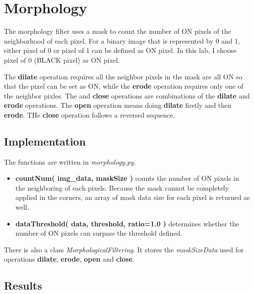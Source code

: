 \documentclass[paper=a4, fontsize=11pt]{scrartcl}
\numberwithin{equation}{section}		%
\numberwithin{figure}{section}			%
\numberwithin{table}{section}				%
\begin{document}
\section{Morphology}

The morphology filter uses a mask to count the number of ON pixels of the neighborhood of each pixel.
For a binary image that is represented by 0 and 1, either pixel of 0 or pixel of 1 can be defined as ON pixel. 
In this lab, I choose pixel of 0 (BLACK pixel) as ON pixel.

The \textbf{dilate} operation requires all the neighbor pixels in the mask are all ON so that the pixel can be set as ON, 
while the \textbf{erode} operation requires only one of the neighbor pixles.
The  and \textbf{close} operations are combinations of the \textbf{dilate} and \textbf{erode} operations.
The \textbf{open} operation means doing \textbf{dilate} firstly and then \textbf{erode}.
THe \textbf{close} operation follows a reversed sequence.

\subsection{Implementation}

The functions are written in \emph{morphology.py}.

\begin{itemize}
\item \textbf{ countNum( img\_data, maskSize ) } counts the number of ON pixels in the neighboring of each pixels. 
Because the mask cannot be completely applied in the corners, an array of mask data size for each pixel is returned as well.
\item \textbf{ dataThreshold( data, threshold, ratio=1.0 ) } determines whether the number of ON pixels can surpass the threshold defined.
\end{itemize}

There is also a class \emph{MorphologicalFiltering}.
It stores the \emph{maskSizeData} used for operations \textbf{dilate}, \textbf{erode}, \textbf{open} and \textbf{close}.

\subsection{Results}

\end{document}
